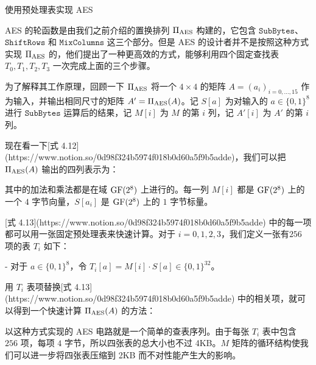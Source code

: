 使用预处理表实现 AES

AES 的轮函数是由我们之前介绍的置换排列 $\Pi_{\rm AES}$ 构建的，它包含 $\mathtt{SubBytes}$、$\mathtt{ShiftRows}$ 和 $\mathtt{MixColumns}$ 这三个部分。但是 AES 的设计者并不是按照这种方式实现 $\Pi_{\rm AES}$ 的，他们提出了一种更高效的方式，能够利用四个固定查找表 $T_0,T_1,T_2,T_3$ 一次完成上面的三个步骤。

为了解释其工作原理，回顾一下 $\Pi_{\rm AES}$ 将一个 $4×4$ 的矩阵 $A=(a_i)_{i=0,\dots,15}$ 作为输入，并输出相同尺寸的矩阵 $A'=\Pi_{\rm AES}(A)$。记 $S[a]$ 为对输入的 $a\in\{0,1\}^8$ 进行 $\mathtt{SubBytes}$ 运算后的结果，记 $M[i]$ 为 $M$ 的第 $i$ 列，记 $A'[i]$ 为 $A'$ 的第 $i$ 列。

现在看一下[式 4.12](https://www.notion.so/0d98f324b5974f018b0d60a5f9b5adde)，我们可以把 $\Pi_{\rm AES}(A)$ 输出的四列表示为：


其中的加法和乘法都是在域 ${\rm GF}(2^8)$ 上进行的。每一列 $M[i]$ 都是 ${\rm GF}(2^8)$ 上的一个 $4$ 字节向量，$S[a_i]$ 是 ${\rm GF}(2^8)$ 上的 $1$ 字节标量。

[式 4.13](https://www.notion.so/0d98f324b5974f018b0d60a5f9b5adde) 中的每一项都可以用一张固定预处理表来快速计算。对于 $i=0,1,2,3$，我们定义一张有$256$ 项的表 $T_i$ 如下：

- 对于 $a\in\{0,1\}^8$，令 $T_i[a]=M[i]\cdot S[a]\in\{0,1\}^{32}$。

用 $T_i$ 表项替换[式 4.13](https://www.notion.so/0d98f324b5974f018b0d60a5f9b5adde) 中的相关项，就可以得到一个快速计算 $\Pi_{\rm AES}(A)$ 的方法：


以这种方式实现的 AES 电路就是一个简单的查表序列。由于每张 $T_i$ 表中包含 $256$ 项，每项 $4$ 字节，所以四张表的总大小也不过 4KB。$M$ 矩阵的循环结构使我们可以进一步将四张表压缩到 2KB 而不对性能产生大的影响。

